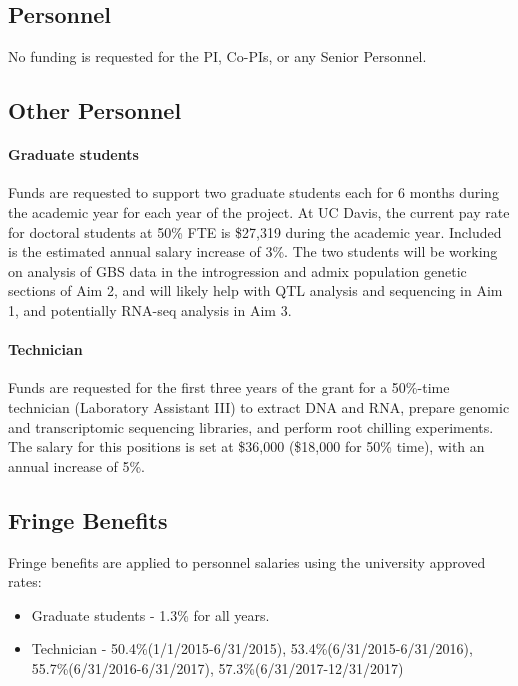 
\renewcommand{\thepage}{f. Budget Justification - Page \arabic{page} of 3}


\subsection*{Personnel}

No funding is requested for the PI, Co-PIs, or any Senior Personnel.

\subsection*{Other Personnel}
\paragraph{Graduate students} 
Funds are requested to support two graduate students each for 6 months during the academic year for each year of the project. At UC Davis, the current pay rate for doctoral students at 50\% FTE is \$27,319 during the academic year. Included is the estimated annual salary increase of 3\%.  The two students will be working on analysis of GBS data in the introgression and admix population genetic sections of Aim 2, and will likely help with QTL analysis and sequencing in Aim 1, and potentially RNA-seq analysis in Aim 3.

\paragraph{Technician}
Funds are requested for the first three years of the grant for a 50\%-time technician (Laboratory Assistant III) to extract DNA and RNA, prepare genomic and transcriptomic sequencing libraries, and perform root chilling experiments.  The salary for this positions is set at \$36,000 (\$18,000 for 50\% time), with an annual increase of 5\%.

\subsection*{Fringe Benefits}
Fringe benefits are applied to personnel salaries using the university approved rates:
\begin{itemize}
\item Graduate students - 1.3\% for all years.
\item Technician - 50.4\%(1/1/2015-6/31/2015), 53.4\%(6/31/2015-6/31/2016), 55.7\%(6/31/2016-6/31/2017), 57.3\%(6/31/2017-12/31/2017)
\end{itemize}

